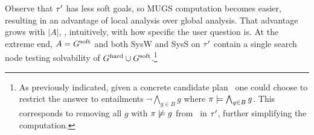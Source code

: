 %
%
%
%
%

Observe that $\tau'$ has less soft goals, so MUGS computation becomes
easier, resulting in an advantage of local analysis over global
analysis. That advantage grows with $|A|$, \ie, intuitively, with how
specific the user question is. At the extreme end, $A = G^{\text{\textup{soft}}}$ and
both SysW and SysS on $\tau'$ contain a single search node testing
solvability of $G^{\text{\textup{hard}}} \cup G^{\text{\textup{soft}}}$.\footnote{As previously
  indicated, given a concrete candidate plan \plan\ one could choose
  to restrict the answer to entailments $\neg \bigwedge_{g \in B} g$
  where $\pi \models \bigwedge_{g \in B} g$. This corresponds to
  removing all $g$ with $\pi \not\models g$ from \goalsoft\ in
  $\tau'$, further simplifying the computation.}
















